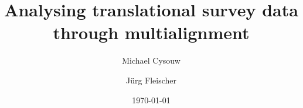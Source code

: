\documentclass[11pt]{article}
\title{Analysing translational survey data through multialignment}
\author{Michael Cysouw \and Jürg Fleischer}
\date{\today}
\begin{document}
  \maketitle
  \begin{abstract}
    
  \end{abstract}




\printbibliography
\end{document}
